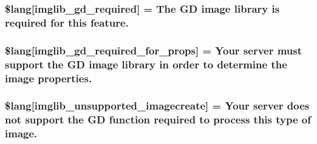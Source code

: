 \subsubsection[{\$lang}]{\setlength{\rightskip}{0pt plus 5cm}\$lang\mbox{[}\textquotesingle{}imglib\+\_\+gd\+\_\+required\textquotesingle{}\mbox{]} = \textquotesingle{}The G\+D image library is required {\bf for} this feature.\textquotesingle{}}\label{_admin_2system_2language_2english_2imglib__lang_8php_aa8d7f8276e62fbe759daef2021c16552}
\hypertarget{_admin_2system_2language_2english_2imglib__lang_8php_a0da9c99f9e2b5f38ccbefb9d9f702c5e}{}
\subsubsection[{\$lang}]{\setlength{\rightskip}{0pt plus 5cm}\$lang\mbox{[}\textquotesingle{}imglib\+\_\+gd\+\_\+required\+\_\+for\+\_\+props\textquotesingle{}\mbox{]} = \textquotesingle{}Your server must support the G\+D image library in order to determine the image properties.\textquotesingle{}}\label{_admin_2system_2language_2english_2imglib__lang_8php_a0da9c99f9e2b5f38ccbefb9d9f702c5e}
\hypertarget{_admin_2system_2language_2english_2imglib__lang_8php_ace032cbe8dafb1f3417a758d0914ecdb}{}
\subsubsection[{\$lang}]{\setlength{\rightskip}{0pt plus 5cm}\$lang\mbox{[}\textquotesingle{}imglib\+\_\+unsupported\+\_\+imagecreate\textquotesingle{}\mbox{]} = \textquotesingle{}Your server does not support the G\+D function required to process this type of image.\textquotesingle{}}\label{_admin_2system_2language_2english_2imglib__lang_8php_ace032cbe8dafb1f3417a758d0914ecdb}
\hypertarget{_admin_2system_2language_2english_2imglib__lang_8php_a235a59a6660145fc136b3933b5b10675}{}
